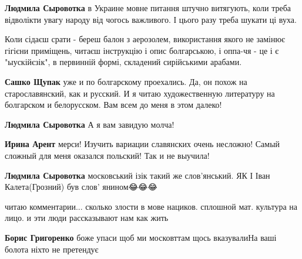 \begin{itemize}
\begin{itemize}
\textbf{Людмила Сыровотка} в Украине мовне питання штучно витягують, коли треба відволікти увагу народу від чогось важливого. І цього разу треба шукати ці вуха.
\end{itemize}



Коли сідаєш срати - береш балон з аерозолем, використання якого не замінює
гігієни приміщень, читаєш інструкцію і опис болгарською, і оппа-чя - це і є
"ыускійєзік", в первинній формі, складений сирійськими арабами.
\begin{itemize}

\textbf{Сашко Щупак} уже и по болгарскому проехались. Да, он похож на старославянский, как и русский. И я читаю художественную литературу на болгарском и белорусском. Вам всем до меня в этом далеко!


\textbf{Людмила Сыровотка} А я вам завидую молча!


\textbf{Ирина Арент} мерси! Изучить вариации славянских очень несложно! Самый сложный для меня оказался польский! Так и не выучила!


\textbf{Людмила Сыровотка} московський ізік такий же слов'янський. ЯК І Іван Калета(Грозний) був слов' янином😂😂😂

\end{itemize}


читаю комментарии... сколько злости в мове нациков. сплошной мат. культура на
лицо. и эти люди рассказывают нам как жить

\begin{itemize}

\textbf{Борис Григоренко} боже упаси щоб ми московттам щось вказувалиНа ваші болота ніхто не претендує


\end{itemize}
\end{itemize}
